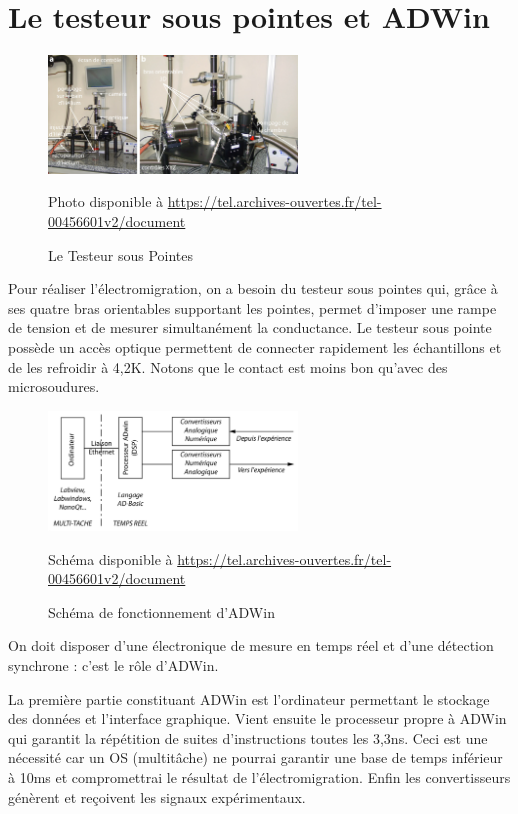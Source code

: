 \section{Le testeur sous pointes et ADWin}
\begin{figure}[h]
    \begin{center}
        \includegraphics[width=250px]{Images/ADWin_avec_legendes}
        \caption{Le Testeur sous Pointes}
        \label{fig:}
        Photo disponible à \url{https://tel.archives-ouvertes.fr/tel-00456601v2/document}
    \end{center}
\end{figure}
Pour réaliser l'électromigration, on a besoin du testeur sous pointes qui, grâce à ses quatre bras orientables supportant les pointes, permet d'imposer une rampe de tension et de mesurer simultanément la conductance. Le testeur sous pointe possède un accès optique permettent de connecter rapidement les échantillons et de les refroidir à 4,2K. Notons que le contact est moins bon qu'avec des microsoudures. 
\begin{figure}[h]
    \begin{center}
        \includegraphics[width=250px]{Images/ADWin_schema}
        \caption{Schéma de fonctionnement d'ADWin}
        \label{fig:}
        Schéma disponible à \url{https://tel.archives-ouvertes.fr/tel-00456601v2/document}
    \end{center}
\end{figure}

On doit disposer d'une électronique de mesure en temps réel et d'une détection synchrone : c'est le rôle d'ADWin.

La première partie constituant ADWin est l'ordinateur permettant le stockage des données et l'interface graphique. Vient ensuite le processeur propre à ADWin qui garantit la répétition de suites d'instructions toutes les 3,3ns. Ceci est une nécessité car un OS (multitâche) ne pourrai garantir une base de temps inférieur à 10ms et compromettrai le résultat de l'électromigration. Enfin les convertisseurs génèrent et reçoivent les signaux expérimentaux.

